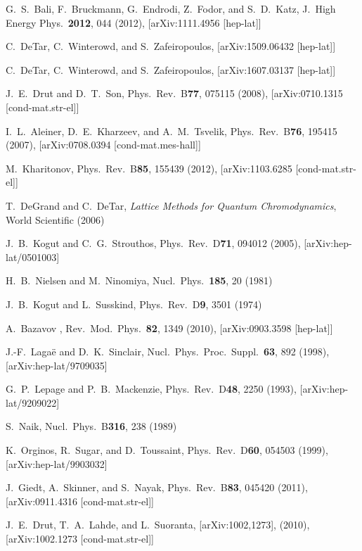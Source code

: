 \documentclass[aps,prd,twocolumn,showpacs,superscriptaddress,groupedaddress]{revtex4}  %
\begin{document}
\begin{thebibliography}{99}
G.~S.~Bali, F.~Bruckmann, G.~Endrodi, Z.~Fodor, and S.~D.~Katz, J.\ High Energy Phys.\ {\bf 2012}, 044 (2012), [arXiv:1111.4956 [hep-lat]]

C.~DeTar, C.~Winterowd, and S.~Zafeiropoulos, [arXiv:1509.06432 [hep-lat]]

C.~DeTar, C.~Winterowd, and S.~Zafeiropoulos, [arXiv:1607.03137 [hep-lat]]

J.~E.~Drut and D.~T.~Son, Phys.\ Rev.\ B{\bf 77}, 075115 (2008), [arXiv:0710.1315 [cond-mat.str-el]]

I.~L.~Aleiner, D.~E.~Kharzeev, and A.~M.~Tsvelik, Phys.\ Rev.\ B{\bf 76}, 195415 (2007), [arXiv:0708.0394 [cond-mat.mes-hall]]

M.~Kharitonov, Phys.\ Rev.\ B{\bf 85}, 155439 (2012), [arXiv:1103.6285 [cond-mat.str-el]]

T.~DeGrand and C.~DeTar, {\it Lattice Methods for Quantum Chromodynamics}, World Scientific (2006)

J.~B.~Kogut and C.~G.~Strouthos, Phys.\ Rev.\ D{\bf 71}, 094012 (2005), [arXiv:hep-lat/0501003]

H.~B.~Nielsen and M.~Ninomiya, Nucl.\ Phys.\ {\bf 185}, 20 (1981)

J.~B.~Kogut and L.~Susskind, Phys.\ Rev.\ D{\bf 9}, 3501 (1974)

A.~Bazavov \etal, Rev.\ Mod.\ Phys.\ {\bf 82}, 1349 (2010), [arXiv:0903.3598 [hep-lat]]

J.-F.~Laga\"e and D.~K.~Sinclair, Nucl.\ Phys.\ Proc.\ Suppl.\ {\bf 63}, 892 (1998), [arXiv:hep-lat/9709035]

G.~P.~Lepage and P.~B.~Mackenzie, Phys.\ Rev.\ D{\bf 48}, 2250 (1993), [arXiv:hep-lat/9209022]

S.~Naik, Nucl.\ Phys.\ B{\bf 316}, 238 (1989)

K.~Orginos, R.~Sugar, and D.~Toussaint, Phys.\ Rev.\ D{\bf 60}, 054503 (1999), [arXiv:hep-lat/9903032]

J.~Giedt, A.~Skinner, and S.~Nayak, Phys.\ Rev.\ B{\bf 83}, 045420 (2011), [arXiv:0911.4316 [cond-mat.str-el]]

J.~E.~Drut, T.~A.~Lahde, and L.~Suoranta, [arXiv:1002,1273], (2010), [arXiv:1002.1273 [cond-mat.str-el]]


\end{thebibliography}
\end{document}
